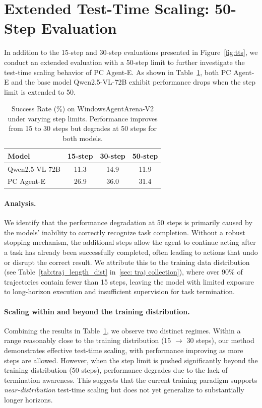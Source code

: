\documentclass{article} %
\begin{document}

\newpage
\section{Extended Test-Time Scaling: 50-Step Evaluation}
\label{appendix:50step}

In addition to the 15-step and 30-step evaluations presented in Figure~\ref{fig:tts}, we conduct an extended evaluation with a 50-step limit to further investigate the test-time scaling behavior of PC Agent-E. As shown in Table~\ref{tab:scaling}, both PC Agent-E and the base model Qwen2.5-VL-72B exhibit performance drops when the step limit is extended to 50.

\begin{table}[h]
\centering
\begin{tabular}{lccc}
\toprule
\textbf{Model} & \textbf{15-step} & \textbf{30-step} & \textbf{50-step} \\
\midrule
Qwen2.5-VL-72B & 11.3 & 14.9 & 11.9 \\
PC Agent-E & 26.9 & 36.0 & 31.4 \\
\bottomrule
\end{tabular}
\caption{Success Rate (\%) on WindowsAgentArena-V2 under varying step limits. Performance improves from 15 to 30 steps but degrades at 50 steps for both models.}
\label{tab:scaling}
\end{table}

\paragraph{Analysis.}
We identify that the performance degradation at 50 steps is primarily caused by the models' inability to correctly recognize task completion. Without a robust stopping mechanism, the additional steps allow the agent to continue acting after a task has already been successfully completed, often leading to actions that undo or disrupt the correct result. We attribute this to the training data distribution (see Table~\ref{tab:traj_length_dist} in~\autoref{sec: traj collection}), where over 90\% of trajectories contain fewer than 15 steps, leaving the model with limited exposure to long-horizon execution and insufficient supervision for task termination.

\paragraph{Scaling within and beyond the training distribution.}
Combining the results in Table~\ref{tab:scaling}, we observe two distinct regimes. Within a range reasonably close to the training distribution (15 $\rightarrow$ 30 steps), our method demonstrates effective test-time scaling, with performance improving as more steps are allowed. However, when the step limit is pushed significantly beyond the training distribution (50 steps), performance degrades due to the lack of termination awareness. This suggests that the current training paradigm supports \emph{near-distribution} test-time scaling but does not yet generalize to substantially longer horizons.
\end{document}
